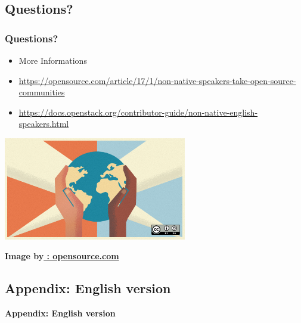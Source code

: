 \documentclass[aspectratio=169,11pt,hyperref={colorlinks=true}]{beamer}
\begin{document}
\subsection{Questions?}
\begin{frame}
  \frametitle{Questions?}
  \begin{itemize}
  \item[] More Informations
  \item \url{https://opensource.com/article/17/1/non-native-speakers-take-open-source-communities}
  \item \url{https://docs.openstack.org/contributor-guide/non-native-english-speakers.html}
  \end{itemize}
  \begin{center}
    \includegraphics[width=0.6\textwidth]{world_hands_diversity.png}
  \end{center}
  \begin{flushright}
    \bf\tiny{Image by}\tiny\url{ : opensource.com}
  \end{flushright}
\end{frame}


\subsection{Appendix: English version}
\begin{frame}
  \bf\Huge{Appendix: English version}
\end{frame}
\end{document}

